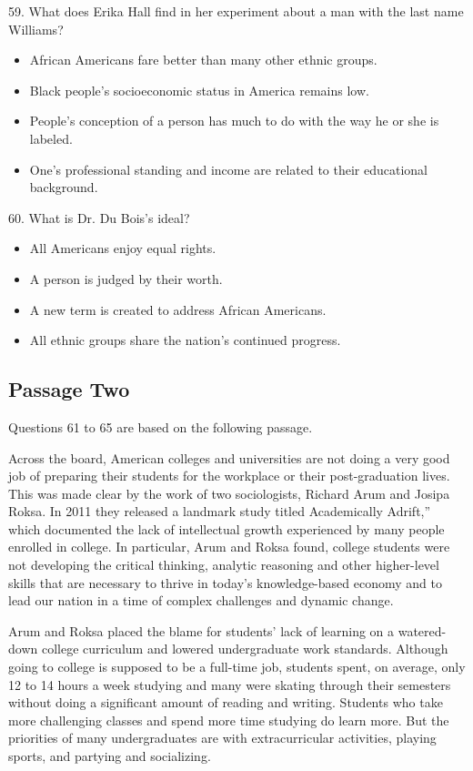 \documentclass[UTF8,11pt]{ctexart}
\begin{document}
59. What does Erika Hall find in her experiment about a man with the last name Williams?


\begin{itemize}[leftmargin=2em,itemsep=.2em,topsep=.4em]\item[A.] African Americans fare better than many other ethnic groups.
\item[B.] Black people’s socioeconomic status in America remains low.
\item[C.] People’s conception of a person has much to do with the way he or she is labeled.
\item[D.] One’s professional standing and income are related to their educational background.
\end{itemize}

60. What is Dr. Du Bois’s ideal?


\begin{itemize}[leftmargin=2em,itemsep=.2em,topsep=.4em]\item[A.] All Americans enjoy equal rights.
\item[B.] A person is judged by their worth.
\item[C.] A new term is created to address African Americans.
\item[D.] All ethnic groups share the nation’s continued progress.
\end{itemize}

\subsection*{Passage Two}


Questions 61 to 65 are based on the following passage.


Across the board, American colleges and universities are not doing a very good job of preparing their students for the workplace or their post-graduation lives. This was made clear by the work of two sociologists, Richard Arum and Josipa Roksa. In 2011 they released a landmark study titled Academically Adrift,” which documented the lack of intellectual growth experienced by many people enrolled in college. In particular, Arum and Roksa found, college students were not developing the critical thinking, analytic reasoning and other higher-level skills that are necessary to thrive in today’s knowledge-based economy and to lead our nation in a time of complex challenges and dynamic change.


Arum and Roksa placed the blame for students’ lack of learning on a watered-down college curriculum and lowered undergraduate work standards. Although going to college is supposed to be a full-time job, students spent, on average, only 12 to 14 hours a week studying and many were skating through their semesters without doing a significant amount of reading and writing. Students who take more challenging classes and spend more time studying do learn more. But the priorities of many undergraduates are with extracurricular activities, playing sports, and partying and socializing.
\end{document}

